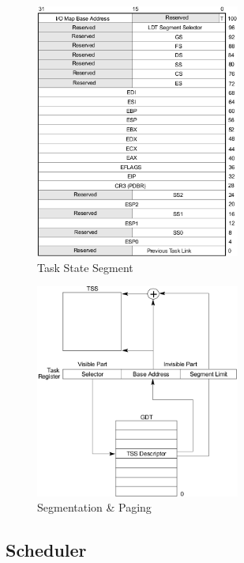 \begin{figure}[H]
  \centering
    \includegraphics[width=0.6\textwidth]{images/tss}
  \caption{Task State Segment}
\end{figure}

\begin{figure}[H]
  \centering
    \includegraphics[width=0.6\textwidth]{images/task_register}
  \caption{Segmentation \& Paging}
\end{figure}

\subsection{Scheduler}